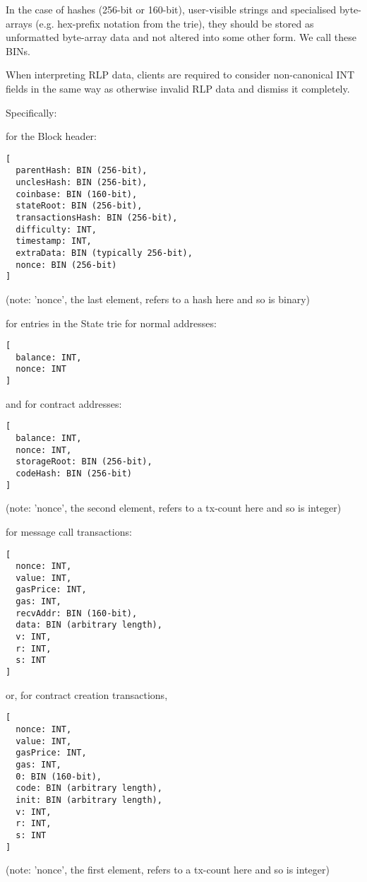 \documentclass[9pt,oneside]{amsart}
\begin{document}
In the case of hashes (256-bit or 160-bit), user-visible strings and specialised byte-arrays (e.g. hex-prefix notation from the trie), they should be stored as unformatted byte-array data and not altered into some other form. We call these BINs.

When interpreting RLP data, clients are required to consider non-canonical INT fields in the same way as otherwise invalid RLP data and dismiss it completely.

Specifically:

for the Block header:
\begin{verbatim}
[
  parentHash: BIN (256-bit),
  unclesHash: BIN (256-bit),
  coinbase: BIN (160-bit),
  stateRoot: BIN (256-bit),
  transactionsHash: BIN (256-bit),
  difficulty: INT,
  timestamp: INT,
  extraData: BIN (typically 256-bit),
  nonce: BIN (256-bit)
]
\end{verbatim}

(note: 'nonce', the last element, refers to a hash here and so is binary)

for entries in the State trie for normal addresses:
\begin{verbatim}
[
  balance: INT,
  nonce: INT
]
\end{verbatim}

and for contract addresses:
\begin{verbatim}
[
  balance: INT,
  nonce: INT,
  storageRoot: BIN (256-bit),
  codeHash: BIN (256-bit)
]
\end{verbatim}

(note: 'nonce', the second element, refers to a tx-count here and so is integer)

for message call transactions:

\begin{verbatim}
[
  nonce: INT,
  value: INT,
  gasPrice: INT,
  gas: INT,
  recvAddr: BIN (160-bit),
  data: BIN (arbitrary length),
  v: INT,
  r: INT,
  s: INT
]
\end{verbatim}

or, for contract creation transactions,

\begin{verbatim}
[
  nonce: INT,
  value: INT,
  gasPrice: INT,
  gas: INT,
  0: BIN (160-bit),
  code: BIN (arbitrary length),
  init: BIN (arbitrary length),
  v: INT,
  r: INT,
  s: INT
]
\end{verbatim}

(note: 'nonce', the first element, refers to a tx-count here and so is integer)
\end{document}
